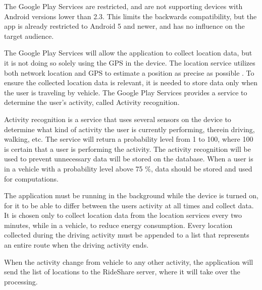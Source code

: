 The Google Play Services are restricted, and are not supporting devices with Android versions lower than 2.3. 
This limits the backwards compatibility, but the app is already restricted to Android 5 and newer, and has no influence on the target audience.

The Google Play Services will allow the application to collect location data, but it is not doing so solely using the GPS in the device. 
The location service utilizes both network location and GPS to estimate a position as precise as possible \cite{GapiLocation}. 
To ensure the collected location data is relevant, it is needed to store data only when the user is traveling by vehicle.
The Google Play Services provides a service to determine the user's activity, called Activity recognition. 

Activity recognition is a service that uses several sensors on the device to determine what kind of activity the user is currently performing, therein driving, walking, etc.
The service will return a probability level from 1 to 100, where 100 is certain that a user is performing the activity.
The activity recognition will be used to prevent unnecessary data will be stored on the database. 
When a user is in a vehicle with a probability level above 75 \%, data should be stored and used for computations.

The application must be running in the background while the device is turned on, for it to be able to differ between the users activity at all times and collect data. 
It is chosen only to collect location data from the location services every two minutes, while in a vehicle, to reduce energy consumption. 
Every location collected during the driving activity must be appended to a list that represents an entire route when the driving activity ends.

When the activity change from vehicle to any other activity, the application will send the list of locations to the RideShare server, where it will take over the processing. 